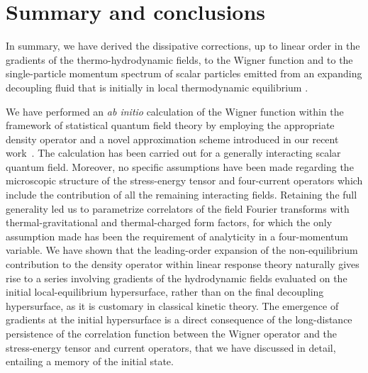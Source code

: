 \documentclass[prd,superscriptaddress,nofootinbib,notitlepage]{revtex4-1}
\begin{document}
\section{Summary and conclusions}
\label{summary}

In summary, we have derived the dissipative corrections, up to linear order in the gradients of the thermo-hydrodynamic fields, 
to the Wigner function and to the single-particle momentum spectrum of scalar particles emitted from an expanding decoupling 
fluid that is initially in local thermodynamic equilibrium .

We have performed an \emph{ab initio} calculation of the Wigner function within the framework of statistical quantum field theory 
by employing the appropriate density operator and a novel approximation scheme introduced in our recent work~\cite{Sheng:2025cjk}. 
The calculation has been carried out for a generally interacting scalar quantum field. Moreover, no specific assumptions have 
been made regarding the microscopic structure of the stress-energy tensor and four-current operators which include the
contribution of all the remaining interacting fields. Retaining the full generality led us to parametrize correlators of
the field Fourier transforms with thermal-gravitational and thermal-charged form factors, for which the only assumption made has 
been the requirement of analyticity in a four-momentum variable. 
We have shown that the leading-order expansion of the non-equilibrium contribution to the density operator within linear response 
theory naturally gives rise to a series involving gradients of the hydrodynamic fields evaluated on the initial local-equilibrium 
hypersurface, rather than on the final decoupling hypersurface, as it is customary in classical kinetic theory. The emergence 
of gradients at the initial hypersurface is a direct consequence of the long-distance persistence of the correlation function 
between the Wigner operator and the stress-energy tensor and current operators, that we have discussed in detail, entailing a
memory of the initial state.
\end{document}
